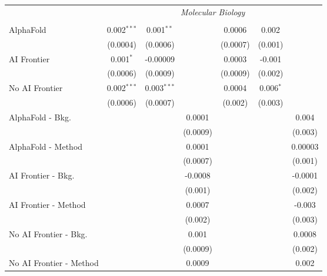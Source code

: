 \begin{tabular}{lcccccc}
 & \multicolumn{6}{c}{\textit{Molecular Biology}} \\ \\
   AlphaFold               & 0.002$^{***}$ & 0.001$^{**}$  &          & 0.0006   & 0.002       &   \\   
                           & (0.0004)      & (0.0006)      &          & (0.0007) & (0.001)     &   \\   
   AI Frontier             & 0.001$^{*}$   & -0.00009      &          & 0.0003   & -0.001      &   \\   
                           & (0.0006)      & (0.0009)      &          & (0.0009) & (0.002)     &   \\   
   No AI Frontier          & 0.002$^{***}$ & 0.003$^{***}$ &          & 0.0004   & 0.006$^{*}$ &   \\   
                           & (0.0006)      & (0.0007)      &          & (0.002)  & (0.003)     &   \\   
   AlphaFold - Bkg.        &               &               & 0.0001   &          &             & 0.004\\   
                           &               &               & (0.0009) &          &             & (0.003)\\   
   AlphaFold - Method      &               &               & 0.0001   &          &             & 0.00003\\   
                           &               &               & (0.0007) &          &             & (0.001)\\   
   AI Frontier - Bkg.      &               &               & -0.0008  &          &             & -0.0001\\   
                           &               &               & (0.001)  &          &             & (0.002)\\   
   AI Frontier - Method    &               &               & 0.0007   &          &             & -0.003\\   
                           &               &               & (0.002)  &          &             & (0.003)\\   
   No AI Frontier - Bkg.   &               &               & 0.001    &          &             & 0.0008\\   
                           &               &               & (0.0009) &          &             & (0.002)\\   
   No AI Frontier - Method &               &               & 0.0009   &          &             & 0.002\\   

\end{tabular}
